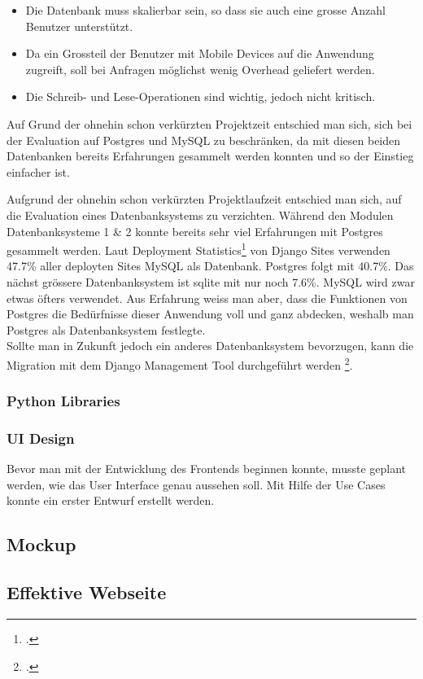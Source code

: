 \begin{itemize}
	\item Die Datenbank muss skalierbar sein, so dass sie auch eine grosse Anzahl Benutzer unterstützt.
	\item Da ein Grossteil der Benutzer mit Mobile Devices auf die Anwendung zugreift, soll bei Anfragen möglichst wenig Overhead geliefert werden.
	\item Die Schreib- und Lese-Operationen sind wichtig, jedoch nicht kritisch. 
\end{itemize}

Auf Grund der ohnehin schon verkürzten Projektzeit entschied man sich, sich bei der Evaluation auf Postgres und MySQL zu beschränken, da mit diesen beiden Datenbanken bereits Erfahrungen gesammelt werden konnten und so der Einstieg einfacher ist. 

Aufgrund der ohnehin schon verkürzten Projektlaufzeit entschied man sich, auf die Evaluation eines Datenbanksystems zu verzichten. Während den Modulen Datenbanksysteme 1 \& 2 konnte bereits sehr viel Erfahrungen mit Postgres gesammelt werden. Laut Deployment Statistics\footcite{deploymentstatistics} von Django Sites verwenden 47.7\% aller deployten Sites MySQL als Datenbank. Postgres folgt mit 40.7\%. Das nächst grössere Datenbanksystem ist sqlite mit nur noch 7.6\%.
MySQL wird zwar etwas öfters verwendet. Aus Erfahrung weiss man aber, dass die Funktionen von Postgres die Bedürfnisse dieser Anwendung voll und ganz abdecken, weshalb man Postgres als Datenbanksystem festlegte. \\

Sollte man in Zukunft jedoch ein anderes Datenbanksystem bevorzugen, kann die Migration mit dem Django Management Tool durchgeführt werden \footcite{dbmigration}. 

\subsubsection*{Python Libraries}

\subsubsection{UI Design}
Bevor man mit der Entwicklung des Frontends beginnen konnte, musste geplant werden, wie das User Interface genau aussehen soll. Mit Hilfe der Use Cases konnte ein erster Entwurf erstellt werden. 

\subsection{Mockup}

\newpage



\subsection{Effektive Webseite}

\newpage